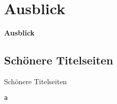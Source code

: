 \section{Ausblick}
\begin{frame}[c]
	\begin{center}
		\LARGE \textbf{Ausblick}
	\end{center}
\end{frame}
\subsection{Schönere Titelseiten}
\begin{frame}[c]
	\begin{center}
		\large Schönere Titelseiten
	\end{center}
\end{frame}
\begin{frame}[fragile]
	\Ausgabe
	\begin{outputbox}
		
	\end{outputbox}

	\pause\Code
	\begin{lstlisting}
a
	\end{lstlisting}
\end{frame}
